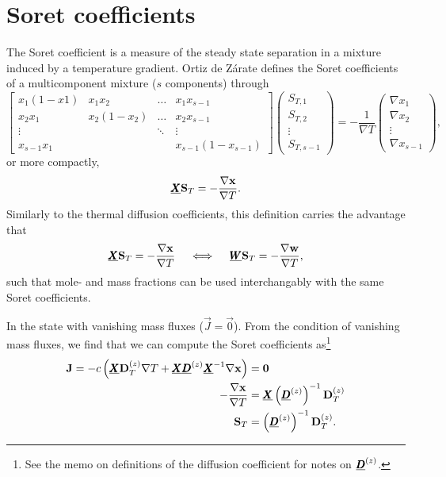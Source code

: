 \section{Soret coefficients}

The Soret coefficient is a measure of the steady state separation in a mixture induced by a temperature gradient. Ortiz de Zárate \cite{ortiz2019definition} defines the Soret coefficients of a multicomponent mixture ($s$ components) through
\begin{equation}
    \begin{bmatrix}
        x_1 (1 - x1) & x_1 x_2 & \hdots & x_1 x_{s - 1} \\
        x_2 x_1 & x_2 (1 - x_2) & \hdots & x_2 x_{s - 1} \\
        \vdots & & \ddots & \vdots \\
        x_{s - 1} x_1 & & & x_{s - 1}(1 - x_{s - 1}) 
    \end{bmatrix}
    \begin{pmatrix}
        S_{T, 1} \\
        S_{T, 2} \\
        \vdots \\
        S_{T, s - 1}
    \end{pmatrix}
    = 
    - \frac{1}{\nabla T}
    \begin{pmatrix}
        \nabla x_1 \\
        \nabla x_2 \\
        \vdots \\
        \nabla x_{s - 1}
    \end{pmatrix},
\end{equation}
or more compactly,
\begin{equation}
    \underline{\pmb{X}} \boldsymbol{\mathrm{S}}_T = - \frac{\nabla \boldsymbol{\mathrm{x}}}{\nabla T}.
\end{equation}
Similarly to the thermal diffusion coefficients, this definition carries the advantage that 
\begin{equation}
    \underline{\pmb{X}} \boldsymbol{\mathrm{S}}_T = - \frac{\nabla \boldsymbol{\mathrm{x}}}{\nabla T} \quad \iff \quad \underline{\pmb{W}} \boldsymbol{\mathrm{S}}_T = - \frac{\nabla \boldsymbol{\mathrm{w}}}{\nabla T},
\end{equation}
such that mole- and mass fractions can be used interchangably with the same Soret coefficients.

In the state with vanishing mass fluxes ($\Vec{J} = \Vec{0}$). From the condition of vanishing mass fluxes, we find that we can compute the Soret coefficients as\footnote{See the memo on definitions of the diffusion coefficient for notes on $\underline{\pmb{D}}^{(z)}$.}
\begin{equation}
    \begin{split}
        \boldsymbol{\mathrm{J}} = - c \left( \underline{\pmb{X}} \boldsymbol{\mathrm{D}}_{T}^{(z)} \nabla T + \underline{\pmb{X}} \underline{\pmb{D}}^{(z)} \underline{\pmb{X}}^{-1} \nabla \boldsymbol{\mathrm{x}} \right) &= \boldsymbol{\mathrm{0}} \\
        - \frac{\nabla \boldsymbol{\mathrm{x}}}{\nabla T} &= \underline{\pmb{X}} \left(\underline{\pmb{D}}^{(z)}\right)^{-1}  \boldsymbol{\mathrm{D}}_{T}^{(z)} \\
        \boldsymbol{\mathrm{S}}_T &= \left(\underline{\pmb{D}}^{(z)}\right)^{-1}  \boldsymbol{\mathrm{D}}_{T}^{(z)}.
    \end{split}
\end{equation}

